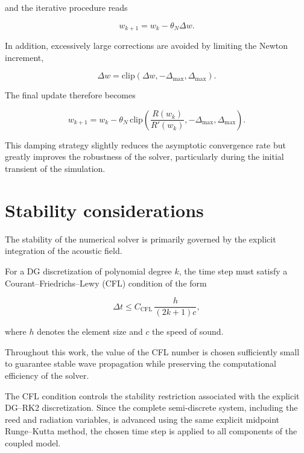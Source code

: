 \documentclass[11pt,a4paper]{report}
\theoremstyle{plain}
\theoremstyle{definition}
\begin{document}
and the iterative procedure reads

\begin{equation}
w_{k+1}
=
w_k
-
\theta_N
\Delta w.
\end{equation}

In addition, excessively large corrections are avoided by limiting the Newton
increment,

\begin{equation}
\Delta w
=
\mathrm{clip}
\left(
\Delta w,
-\Delta_{\max},
\Delta_{\max}
\right).
\end{equation}

The final update therefore becomes

\begin{equation}
w_{k+1}
=
w_k
-
\theta_N
\,
\mathrm{clip}
\left(
\frac{R(w_k)}
{R'(w_k)},
-\Delta_{\max},
\Delta_{\max}
\right).
\end{equation}

This damping strategy slightly reduces the asymptotic convergence rate but
greatly improves the robustness of the solver, particularly during the initial
transient of the simulation.



\section{Stability considerations}

The stability of the numerical solver is primarily governed by the explicit
integration of the acoustic field.

For a DG discretization of polynomial degree \(k\), the time step must satisfy
a Courant--Friedrichs--Lewy (CFL) condition of the form

\begin{equation}
\boxed{
\Delta t
\le
C_{\mathrm{CFL}}
\,
\frac{h}
{(2k+1)c},
}
\end{equation}

where \(h\) denotes the element size and \(c\) the speed of sound.

Throughout this work, the value of the CFL number is chosen sufficiently small
to guarantee stable wave propagation while preserving the computational
efficiency of the solver.

The CFL condition controls the stability restriction associated with the
explicit DG--RK2 discretization. Since the complete semi-discrete system,
including the reed and radiation variables, is advanced using the same explicit
midpoint Runge--Kutta method, the chosen time step is applied to all components
of the coupled model.
\end{document}
